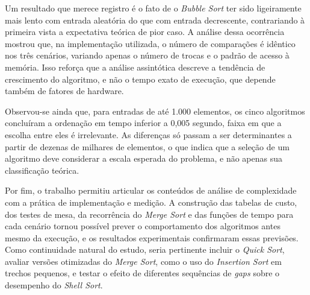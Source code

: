 \qquad Um resultado que merece registro é o fato de o \textit{Bubble Sort} ter sido ligeiramente mais lento com entrada aleatória do que com entrada decrescente, contrariando à primeira vista a expectativa teórica de pior caso. A análise dessa ocorrência mostrou que, na implementação utilizada, o número de comparações é idêntico nos três cenários, variando apenas o número de trocas e o padrão de acesso à memória. Isso reforça que a análise assintótica descreve a tendência de crescimento do algoritmo, e não o tempo exato de execução, que depende também de fatores de hardware.

\qquad Observou-se ainda que, para entradas de até 1.000 elementos, os cinco algoritmos concluíram a ordenação em tempo inferior a 0,005 segundo, faixa em que a escolha entre eles é irrelevante. As diferenças só passam a ser determinantes a partir de dezenas de milhares de elementos, o que indica que a seleção de um algoritmo deve considerar a escala esperada do problema, e não apenas sua classificação teórica.

\qquad Por fim, o trabalho permitiu articular os conteúdos de análise de complexidade com a prática de implementação e medição. A construção das tabelas de custo, dos testes de mesa, da recorrência do \textit{Merge Sort} e das funções de tempo para cada cenário tornou possível prever o comportamento dos algoritmos antes mesmo da execução, e os resultados experimentais confirmaram essas previsões. Como continuidade natural do estudo, seria pertinente incluir o \textit{Quick Sort}, avaliar versões otimizadas do \textit{Merge Sort}, como o uso do \textit{Insertion Sort} em trechos pequenos, e testar o efeito de diferentes sequências de \textit{gaps} sobre o desempenho do \textit{Shell Sort}.